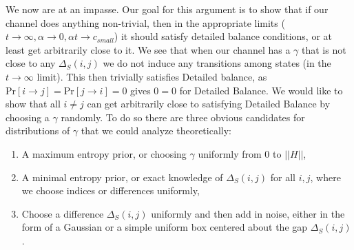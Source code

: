 \documentclass{article}
\newcommand{\norm}[1]{\left| \left| #1 \right| \right|}
\newcommand{\prob}[1]{\text{Pr}\left[ #1 \right]}
\begin{document}
We now are at an impasse. Our goal for this argument is to show that if our channel does anything non-trivial, then in the appropriate limits ($t \to \infty, \alpha \to 0, \alpha t \to c_{small}$) it should satisfy detailed balance conditions, or at least get arbitrarily close to it. We see that when our channel has a $\gamma$ that is not close to any $\Delta_S(i,j)$ we do not induce any transitions among states (in the $t \to \infty$ limit). This then trivially satisfies Detailed balance, as $\prob{i \to j} = \prob{j \to i} = 0$ gives $0 = 0$ for Detailed Balance. We would like to show that all $i \neq j$ can get arbitrarily close to satisfying Detailed Balance by choosing a $\gamma$ randomly. To do so there are three obvious candidates for distributions of $\gamma$ that we could analyze theoretically:
\begin{enumerate}
    \item A maximum entropy prior, or choosing $\gamma$ uniformly from 0 to $\norm{H}$,
    \item A minimal entropy prior, or exact knowledge of $\Delta_S(i,j)$ for all $i,j$, where we choose indices or differences uniformly,
    \item Choose a difference $\Delta_S(i,j)$ uniformly and then add in noise, either in the form of a Gaussian or a simple uniform box centered about the gap $\Delta_S(i,j)$.
\end{enumerate}
\end{document}
